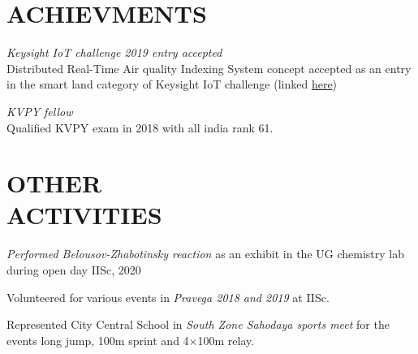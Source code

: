 \documentclass[margin, 10pt]{res} %
\begin{document}
\begin{resume}

\section{ACHIEVMENTS}

{\sl Keysight IoT challenge 2019 entry accepted}\\
Distributed Real-Time Air quality Indexing System concept accepted
as an entry in the smart land category of Keysight IoT challenge (linked \href{https://www.iotchallengekeysight.com/2019/entries/smart-land/41-0413-102730-draqis-distributed-real-time-air-quality-indexing-system}{here})

{\sl KVPY fellow}\\
Qualified KVPY exam in 2018 with all india rank 61.


\section{OTHER \\ ACTIVITIES} 
{\it Performed Belousov-Zhabotinsky reaction} as an exhibit in the UG chemistry lab during open day IISc, 2020
\smallskip

Volunteered for various events in {\it Pravega 2018 and 2019} at IISc.
\smallskip

Represented City Central School in {\it South Zone Sahodaya sports meet} for the events
long jump, 100m sprint and 4$\times$100m relay.


\end{resume}
\end{document}
